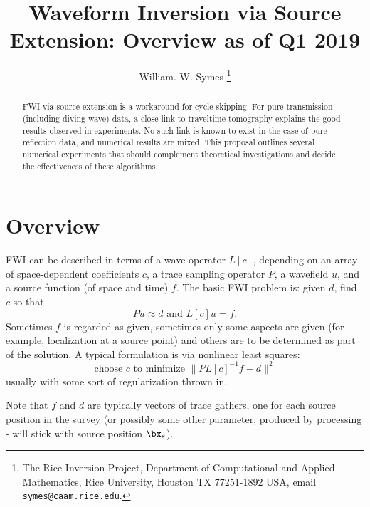 \title{Waveform Inversion via Source Extension: Overview as of Q1 2019}
\author{William. W. Symes \thanks{The Rice Inversion Project,
Department of Computational and Applied Mathematics, Rice University,
Houston TX 77251-1892 USA, email {\tt symes@caam.rice.edu}.}}




\maketitle
\begin{abstract}
FWI via source extension is a workaround for cycle skipping. For pure transmission (including diving wave) data, a close link to traveltime tomography explains the good results observed in experiments. No such link is known to exist in the case of pure reflection data, and numerical results are mixed. This proposal outlines several numerical experiments that should complement theoretical investigations and decide the effectiveness of these algorithms.
\end{abstract}

\section{Overview}
FWI can be described in terms of a wave operator $L[c]$, depending on an array of space-dependent coefficients $c$, a trace sampling operator $P$, a wavefield $u$, and a source function (of space and time) $f$. The basic FWI problem is: given $d$, find $c$ so that 
\begin{equation}
\label{eqn:fwi}
Pu \approx d \mbox{ and } L[c]u = f.
\end{equation}
Sometimes $f$ is regarded as given, sometimes only some aspects are given (for example, localization at a source point) and others are to be determined as part of the solution. A typical formulation is via nonlinear least squares:
\[
\mbox{choose } c \mbox{ to minimize } \|PL[c]^{-1}f -d \|^2 
\]
usually with some sort of regularization thrown in.

Note that $f$ and $d$ are typically vectors of trace gathers, one for each source position in the survey (or possibly some other parameter, produced by processing - will stick with source position $\bx_s$).

